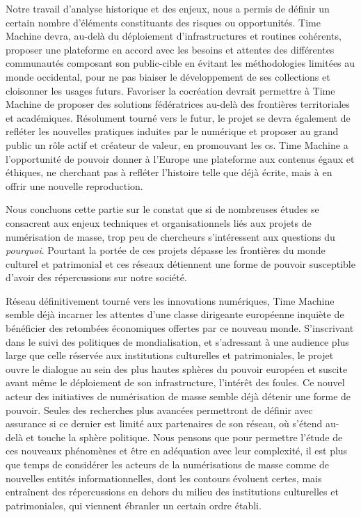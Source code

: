 Notre travail d'analyse historique et des enjeux, nous a permis de définir un certain nombre d'éléments constituants des risques ou opportunités. Time Machine devra, au-delà du déploiement d'infrastructures et routines cohérents, proposer une plateforme en accord avec les besoins et attentes des différentes communautés composant son public-cible en évitant les méthodologies limitées au monde occidental, pour ne pas biaiser le développement de ses collections et cloisonner les usages futurs. Favoriser la cocréation devrait permettre à Time Machine de proposer des solutions fédératrices au-delà des frontières territoriales et académiques. Résolument tourné vers le futur, le projet se devra également de refléter les nouvelles pratiques induites par le numérique et proposer au grand public un rôle actif et créateur de valeur, en promouvant les \gls{cs}. Time Machine a l'opportunité de pouvoir donner à l'Europe une plateforme aux contenus égaux et éthiques, ne cherchant pas à refléter l'histoire telle que déjà écrite, mais à en offrir une nouvelle reproduction. 

Nous concluons cette partie sur le constat que si de nombreuses études se consacrent aux enjeux techniques et organisationnels liés aux projets de numérisation de masse, trop peu de chercheurs s'intéressent aux questions du \textit{pourquoi}. Pourtant la portée de ces projets dépasse les frontières du monde culturel et patrimonial et ces réseaux détiennent une forme de pouvoir susceptible d'avoir des répercussions sur notre société. 

Réseau définitivement tourné vers les innovations numériques, Time Machine semble déjà incarner les attentes d'une classe dirigeante européenne inquiète de bénéficier des retombées économiques offertes par ce nouveau monde. S'inscrivant dans le suivi des politiques de mondialisation, et s'adressant à une audience plus large que celle réservée aux institutions culturelles et patrimoniales, le projet ouvre le dialogue au sein des plus hautes sphères du pouvoir européen et suscite avant même le déploiement de son infrastructure, l'intérêt des foules. Ce nouvel acteur des initiatives de numérisation de masse semble déjà détenir une forme de pouvoir. Seules des recherches plus avancées permettront de définir avec assurance si ce dernier est limité aux partenaires de son réseau, où s'étend au-delà et touche la sphère politique. Nous pensons que pour permettre l'étude de ces nouveaux phénomènes et être en adéquation avec leur complexité, il est plus que temps de considérer les acteurs de la numérisations de masse comme de nouvelles entités informationnelles, dont les contours évoluent certes, mais entraînent des répercussions en dehors du milieu des institutions culturelles et patrimoniales, qui viennent ébranler un certain ordre établi.

